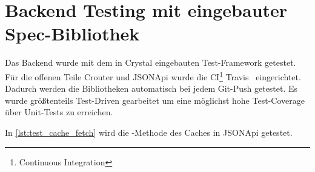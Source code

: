 \section{Backend Testing mit eingebauter Spec-Bibliothek}
\label{sec:t_backend_testing_mit_eingebauter_spec_bibliothek'}

Das Backend wurde mit dem in Crystal eingebauten Test-Framework getestet.  Für
die offenen Teile Crouter und JSONApi wurde die
CI\footnote{Continuous Integration} Travis~\cite{travis} eingerichtet.  Dadurch
werden die Bibliotheken automatisch bei jedem Git-Push getestet. Es wurde
größtenteils Test-Driven gearbeitet um eine möglichst hohe
Test-Coverage über Unit-Tests zu erreichen.

In \cref{lst:test_cache_fetch} wird die -Methode des Caches in
JSONApi getestet.


